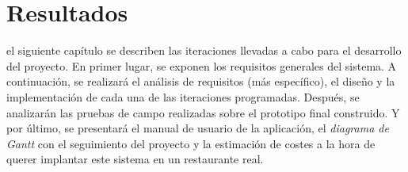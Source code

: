 
\chapter{Resultados}
\label{chap:results}
 el siguiente capítulo se describen las iteraciones llevadas a cabo 
para el desarrollo del proyecto. En primer lugar, se exponen los requisitos 
generales del sistema. A continuación, se realizará el análisis de requisitos 
(más específico), el diseño y la implementación de cada una de las iteraciones
programadas. Después, se analizarán las pruebas de campo realizadas sobre
el prototipo final construido. Y por último, se presentará el manual de usuario
de la aplicación, el \emph{diagrama de Gantt} con el seguimiento del proyecto
y la estimación de costes a la hora de querer implantar este sistema en un
restaurante real.

